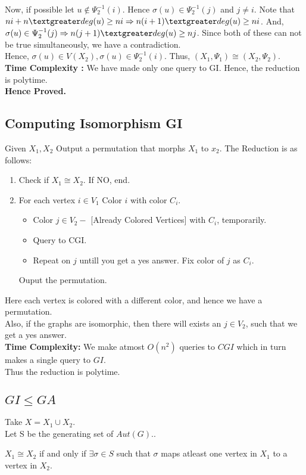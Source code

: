 Now, if possible let $u \notin \Psi_2^{-1}(i)$. Hence $\sigma(u) \in \Psi_2^{-1}(j)$ and $j \neq i$.
Note that $ni + n \textgreater deg(u) \ge ni \implies n(i+1) \textgreater deg(u) \ge ni$.
And, $\sigma(u) \in \Psi_2^{-1}(j) \implies n(j+1) \textgreater deg(u) \ge nj$. Since both of these can not be true simultaneously, we have a contradiction.\\

Hence, $\sigma(u) \in V(X_2) , \sigma(u) \in \Psi_2^{-1}(i)$. Thus, $(X_1,\Psi_1) \cong (X_2,\Psi_2)$.\\

\textbf{Time Complexity :} We have made only one query to GI. Hence, the reduction is polytime.\\

\textbf{Hence Proved.}

\subsection{Computing Isomorphism \le GI}
Given $X_1,X_2$ Output a permutation that morphs $X_1$ to $x_2$.
The Reduction is as follows:
\begin{enumerate}
\item Check if $X_1 \cong X_2$. If NO, end.
\item For each vertex $i \in V_1$ 
	Color $i$ with color $C_i$.
	\begin{itemize}
	\item Color $j \in V_2 -$ [Already Colored Vertices] with $C_i$, temporarily.
	\item Query to CGI.
	\item Repeat on $j$ untill you get a yes answer. Fix color of $j$ as $C_i$.
	\end{itemize}
Ouput the permutation.
\end{enumerate}
Here each vertex is colored with a different color, and hence we have a permutation.\\
Also, if the graphs are isomorphic, then there will exists an $j \in V_2$, such that we get a yes answer.\\

\textbf{Time Complexity:} We make atmost $O(n^2)$ queries to $CGI$ which in turn makes a single query to $GI$.\\Thus the reduction is polytime.




\subsection{$GI \le GA$}
Take $X = X_1 \cup X_2$.\\
Let S be the generating set of $Aut(G)$..\\
\begin{claim}
$X_1 \cong X_2$ if and only if $\exists \sigma \in S$ such that $\sigma$ maps atleast one vertex in $X_1$ to a vertex in $X_2$.
\end{claim}


